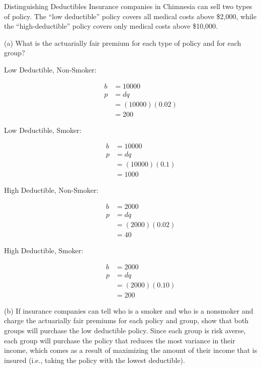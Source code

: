\documentclass[8pt]{extarticle}
\begin{document}
\begin{problem}{Distinguishing Deductibles}
    Insurance companies in Chimnesia can sell two types of policy. The ``low deductible'' policy covers all medical costs above \$2,000, while the ``high-deductible'' policy covers only medical costs above \$10,000.
    \begin{problem}{(a)}
      What is the actuarially fair premium for each type of policy and for each group?
      \tcblower
      \begin{description}
        \item[Low Deductible, Non-Smoker:]
          \begin{align*}
            b &= 10000\\
            p&= dq\\
             &= (10000)(0.02)\\
             &= 200
          \end{align*}
        \item[Low Deductible, Smoker:]
          \begin{align*}
            b &= 10000\\
            p&= dq\\
             &= (10000)(0.1)\\
             &= 1000
          \end{align*}
        \item[High Deductible, Non-Smoker:]
          \begin{align*}
            b &= 2000\\
            p&= dq\\
             &= (2000)(0.02)\\
             &= 40
          \end{align*}
        \item[High Deductible, Smoker:]
          \begin{align*}
            b &= 2000\\
            p&= dq\\
             &= (2000)(0.10)\\
             &= 200
          \end{align*}
      \end{description}
    \end{problem}
    \begin{problem}{(b)}
      If insurance companies can tell who is a smoker and who is a nonsmoker and charge the actuarially fair premiums for each policy and group, show that both groups will purchase the low deductible policy.
      \tcblower
      Since each group is risk averse, each group will purchase the policy that reduces the most variance in their income, which comes as a result of maximizing the amount of their income that is insured (i.e., taking the policy with the lowest deductible).
    \end{problem}
  \end{problem}
\end{document}
